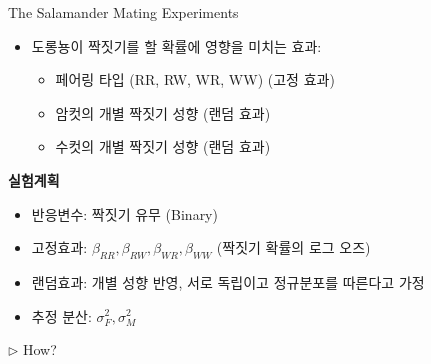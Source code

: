\documentclass[9pt, xelatex]{beamer}
\begin{document}
{\begin{frame}[allowframebreaks]{The Salamander Mating Experiments}
\begin{itemize}
			 \item 도롱뇽이 짝짓기를 할 확률에 영향을 미치는 효과:
			 \begin{itemize}
			 	\item 페어링 타입 (RR, RW, WR, WW) (고정 효과)
			 	\item 암컷의 개별 짝짓기 성향 (랜덤 효과)
			 	\item 수컷의 개별 짝짓기 성향 (랜덤 효과)
			 \end{itemize}
		\end{itemize}
	
	\pagebreak
		\textbf{실험계획} \\
	\vspace{4mm}
	\begin{itemize}
		
		\item 반응변수: 짝짓기 유무 (Binary)
		\item 고정효과: $\beta_{RR}, \beta_{RW}, \beta_{WR}, \beta_{WW}$ (짝짓기 확률의 로그 오즈)
		\item 랜덤효과: 개별 성향 반영, 서로 독립이고 정규분포를 따른다고 가정
		\item 추정 분산: $\sigma_{F}^{2}, \sigma_{M}^{2}$
		
	\end{itemize}
	\vspace{5mm}
	
		$\triangleright$ How?


	\end{frame}
}
\end{document}
